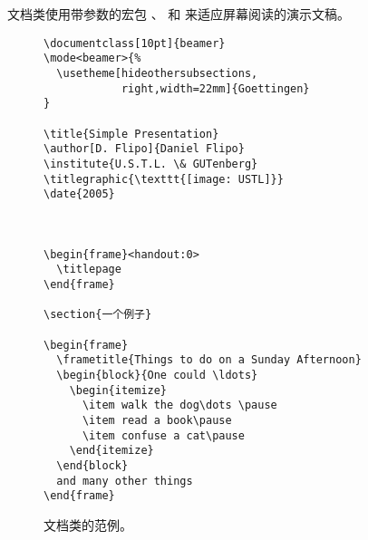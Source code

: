  文档类使用带参数的宏包 、  和  来适应屏幕阅读的演示文稿。



\begin{figure}[htbp]
\begin{verbatim}
\documentclass[10pt]{beamer}
\mode<beamer>{%
  \usetheme[hideothersubsections,
            right,width=22mm]{Goettingen}
}

\title{Simple Presentation}
\author[D. Flipo]{Daniel Flipo}
\institute{U.S.T.L. \& GUTenberg}
\titlegraphic{\texttt{[image: USTL]}}
\date{2005}



\begin{frame}<handout:0>
  \titlepage
\end{frame}

\section{一个例子}

\begin{frame}
  \frametitle{Things to do on a Sunday Afternoon}
  \begin{block}{One could \ldots}
    \begin{itemize}
      \item walk the dog\dots \pause
      \item read a book\pause
      \item confuse a cat\pause
    \end{itemize}
  \end{block}
  and many other things
\end{frame}

\end{verbatim}
\caption{  文档类的范例。}
  \label{fig:code-beamer}
\end{figure}


